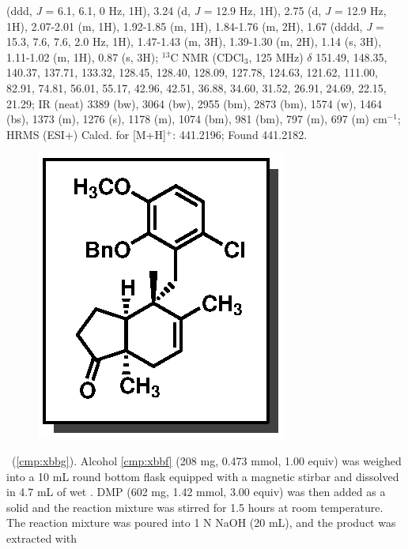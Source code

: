 (ddd, \textit{J} = 6.1, 6.1, 0 Hz, 1H), 3.24 (d, \textit{J} = 12.9 Hz, 1H), 2.75 (d, \textit{J} = 12.9 Hz, 1H), 2.07-2.01 (m,
1H), 1.92-1.85 (m, 1H), 1.84-1.76 (m, 2H), 1.67 (dddd, \textit{J} = 15.3, 7.6, 7.6, 2.0 Hz, 1H), 1.47-1.43
(m, 3H), 1.39-1.30 (m, 2H), 1.14 (s, 3H), 1.11-1.02 (m, 1H), 0.87 (s, 3H); $^{13}$C NMR (CDCl$_3$, 125
MHz) $\delta$ 151.49, 148.35, 140.37, 137.71, 133.32, 128.45, 128.40, 128.09, 127.78, 124.63, 121.62,
111.00, 82.91, 74.81, 56.01, 55.17, 42.96, 42.51, 36.88, 34.60, 31.52, 26.91, 24.69, 22.15, 21.29;
IR (neat) 3389 (bw), 3064 (bw), 2955 (bm), 2873 (bm), 1574 (w), 1464 (bs), 1373 (m), 1276 (s), 1178 (m), 1074 (bm), 981 (bm), 797 (m), 697 (m) cm$^{-1}$; HRMS (ESI+) Calcd. for
 [M+H]$^+$: 441.2196; Found 441.2182.

\pagebreak
\begin{figure}
  \vspace{-15pt}
  \begin{center}
    \includegraphics[scale=0.8]{chp_singlecarbon/images/xbbg}
  \end{center}
  \vspace{-30pt}
\end{figure}\noindent \textbf{\CMPxbbg}\ (\ref{cmp:xbbg}). Alcohol \ref{cmp:xbbf} (208 mg, 0.473
mmol, 1.00 equiv) was weighed into a 10 mL round bottom flask equipped with a
magnetic stirbar and dissolved in 4.7 mL of wet . DMP (602 mg, 1.42 mmol, 3.00 equiv) was
then added as a solid and the reaction mixture was stirred for 1.5 hours at room temperature. The
reaction mixture was poured into 1 N NaOH (20 mL), and the product was extracted with 
